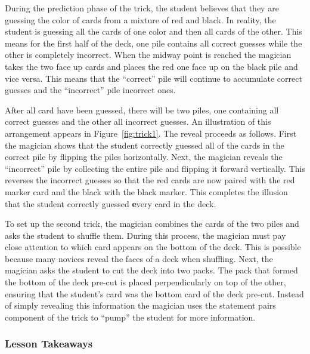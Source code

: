 During the prediction phase of the trick, the student believes that they are
guessing the color of cards from a mixture of red and black.
In reality,
the student is guessing all the cards of one color and then all cards of
the other.
This means for the first half of the deck, one pile contains all correct
guesses while the other is completely incorrect.
When the midway point is reached the magician takes the two face up cards and places the
red one face up on the black pile and vice versa.
This means that the ``correct'' pile will continue to accumulate correct
guesses and the ``incorrect'' pile incorrect ones.

After all card have been guessed, there will be two piles,
one containing all correct guesses and the other
all incorrect guesses.
An illustration of this arrangement appears in Figure~\ref{fig:trick1}.
The reveal proceeds as follows.
First the magician shows that the student correctly guessed all of the cards
in the correct pile by flipping the piles horizontally.
Next, the magician reveals the ``incorrect'' pile by collecting the
entire pile and flipping it forward vertically.  This
reverses the incorrect guesses so that the red cards are now paired
with the red marker card and the black with the black marker.  This completes
the illusion that the student correctly guessed {\textbf every} card in the
deck.

To set up the second trick, the magician combines the cards of the two piles and asks the
student to shuffle them.  During this process, the magician must pay close
attention to which card appears on the bottom of the deck.  This is possible
because many novices reveal the faces of a deck when shuffling.  Next,
the magician asks the student to cut the deck into two packs.  The pack that
formed the bottom of the deck pre-cut is placed perpendicularly on
top of the other, ensuring that the student's card was the bottom card of
the deck pre-cut. Instead of simply revealing this information the
magician uses the statement pairs component of the trick to ``pump'' the student
for more information.

%

\subsubsection{Lesson Takeaways}

